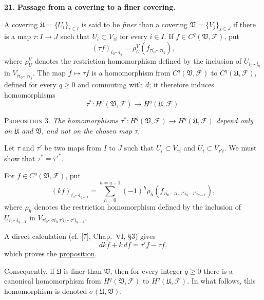 
\medskip
{}\label{fac:I:3:no:21}
\textbf{21. Passage from a covering to a finer covering.}

A covering $\mathfrak{U}=\{U_i\}_{i\in I}$ is said to be \textit{finer} than a covering $\mathfrak{V}=\{V_j\}_{j\in J}$ if there is a map $\tau:I\to J$ such that $U_i\subset V_{\tau i}$ for every $i\in I$. If $f\in C^q(\mathfrak{V},\mathcal{F})$, put
\[
(\tau f)_{i_0\cdots i_q}
=\rho_U^V(f_{\tau i_0\cdots\tau i_q}),
\]
where $\rho_U^V$ denotes the restriction homomorphism defined by the inclusion of $U_{i_0\cdots i_q}$ in $V_{\tau i_0\cdots\tau i_q}$. The map $f\mapsto\tau f$ is a homomorphism from $C^q(\mathfrak{V},\mathcal{F})$ to $C^q(\mathfrak{U},\mathcal{F})$, defined for every $q\geq0$ and commuting with $d$; it therefore induces homomorphisms
\[
\tau^*:H^q(\mathfrak{V},\mathcal{F})
\longrightarrow H^q(\mathfrak{U},\mathcal{F}).
\]

\label{fac:I:3:no:21:prop:3}
\textsc{Proposition 3.} \textit{The homomorphisms $\tau^*:H^q(\mathfrak{V},\mathcal{F})\to H^q(\mathfrak{U},\mathcal{F})$ depend only on $\mathfrak{U}$ and $\mathfrak{V}$, and not on the chosen map $\tau$.}

Let $\tau$ and $\tau'$ be two maps from $I$ to $J$ such that $U_i\subset V_{\tau i}$ and $U_i\subset V_{\tau'i}$. We must show that $\tau^*=\tau'^*$.

For $f\in C^q(\mathfrak{V},\mathcal{F})$, put
\[
(kf)_{i_0\cdots i_{q-1}}
=\sum_{h=0}^{h=q-1}(-1)^h
\rho_h(f_{\tau i_0\cdots\tau i_h\,\tau'i_h\cdots\tau'i_{q-1}}),
\]
where $\rho_h$ denotes the restriction homomorphism defined by the inclusion of $U_{i_0\cdots i_{q-1}}$ in $V_{\tau i_0\cdots\tau i_h\,\tau'i_h\cdots\tau'i_{q-1}}$.

A direct calculation (cf. [7], Chap.~VI, \S3) gives
\[
dkf+k\,df=\tau'f-\tau f,
\]
which proves the \hyperref[fac:I:3:no:21:prop:3]{proposition}.

Consequently, if $\mathfrak{U}$ is finer than $\mathfrak{V}$, then for every integer $q\geq0$ there is a canonical homomorphism from $H^q(\mathfrak{V},\mathcal{F})$ to $H^q(\mathfrak{U},\mathcal{F})$. In what follows, this homomorphism is denoted $\sigma(\mathfrak{U},\mathfrak{V})$.
